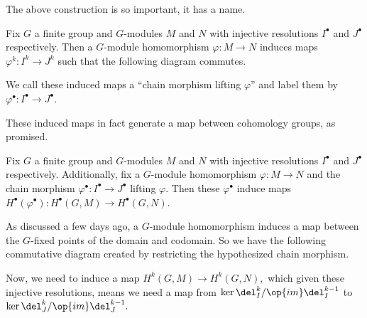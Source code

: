 The above construction is so important, it has a name.
\begin{definition}
    Fix $G$ a finite group and $G$-modules $M$ and $N$ with injective resolutions $I^\bullet$ and $J^\bullet$ respectively. Then a $G$-module homomorphism $\varphi:M\to N$ induces maps $\varphi^k:I^k\to J^k$ such that the following diagram commutes.
    \begin{center}
    \end{center}
    We call these induced maps a ``chain morphism lifting $\varphi$'' and label them by $\varphi^\bullet:I^\bullet\to J^\bullet.$
\end{definition}

These induced maps in fact generate a map between cohomology groups, as promised.
\begin{proposition}
    Fix $G$ a finite group and $G$-modules $M$ and $N$ with injective resolutions $I^\bullet$ and $J^\bullet$ respectively. Additionally, fix a $G$-module homomorphism $\varphi:M\to N$ and the chain morphism $\varphi^\bullet:I^\bullet\to J^\bullet$ lifting $\varphi.$ Then these $\varphi^\bullet$ induce maps $H^\bullet\left(\varphi^\bullet\right):H^\bullet(G,M)\to H^\bullet(G,N).$
\end{proposition}
As discussed a few days ago, a $G$-module homomorphism induces a map between the $G$-fixed points of the domain and codomain. So we have the following commutative diagram created by restricting the hypothesized chain morphism.
\begin{center}
\end{center}
Now, we need to induce a map $H^k(G,M)\to H^k(G,N),$ which given these injective resolutions, means we need a map from $\ker\del_I^k/\op{im}\del_I^{k-1}$ to $\ker\del_J^k/\op{im}\del_J^{k-1}.$


